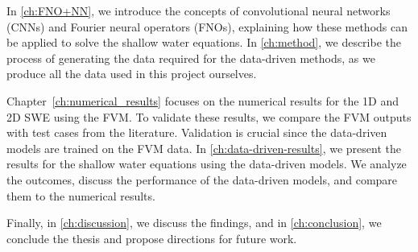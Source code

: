 In \autoref{ch:FNO+NN}, we introduce the concepts of convolutional neural networks (CNNs) and Fourier neural operators (FNOs), explaining how these methods can be applied to solve the shallow water equations.
In \autoref{ch:method}, we describe the process of generating the data required for the data-driven methods, as we produce all the data used in this project ourselves.

Chapter~\ref{ch:numerical_results} focuses on the numerical results for the 1D and 2D SWE using the FVM.
To validate these results, we compare the FVM outputs with test cases from the literature. Validation is crucial since the data-driven models are trained on the FVM data.
In \autoref{ch:data-driven-results}, we present the results for the shallow water equations using the data-driven models.
We analyze the outcomes, discuss the performance of the data-driven models, and compare them to the numerical results.

Finally, in \autoref{ch:discussion}, we discuss the findings, and in \autoref{ch:conclusion}, we conclude the thesis and propose directions for future work.


